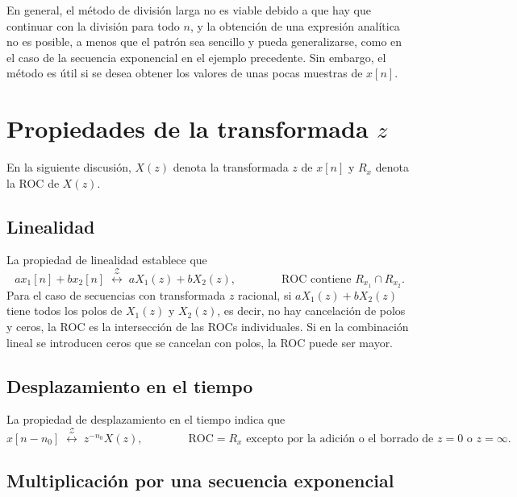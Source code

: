 \documentclass[a4paper]{report}
\begin{document}
En general, el método de división larga no es viable debido a que hay que continuar con la división para todo \(n\), y la obtención de una expresión analítica no es posible, a menos que el patrón sea sencillo y  pueda generalizarse, como en el caso de la secuencia exponencial en el ejemplo precedente. Sin embargo, el método es útil si se desea obtener los valores de unas pocas muestras de \(x[n]\).

\section{Propiedades de la transformada \texorpdfstring{\(z\)}{z}}\label{sec:z_transform_properties}
 
En la siguiente discusión, \(X(z)\) denota la transformada \(z\) de \(x[n]\) y \(R_x\) denota la ROC de \(X(z)\).

\subsection{Linealidad} 
 
La propiedad de linealidad establece que 
\[
 ax_1[n]+bx_2[n]\;\overset{\mathcal{Z}}{\longleftrightarrow}\;aX_1(z)+bX_2(z),
 \qquad\qquad\textrm{ROC contiene }R_{x_1}\cap R_{x_2}.
\]
Para el caso de secuencias con transformada \(z\) racional, si \(aX_1(z)+bX_2(z)\) tiene todos los polos de \(X_1(z)\) y \(X_2(z)\), es decir, no hay cancelación de polos y ceros, la ROC es la intersección de las ROCs individuales. Si en la combinación lineal se introducen ceros que se cancelan con polos, la ROC puede ser mayor.
 
\subsection{Desplazamiento en el tiempo} 
 
La propiedad de desplazamiento en el tiempo indica que 
\[
 x[n-n_0]\;\overset{\mathcal{Z}}{\longleftrightarrow}\;z^{-n_0}X(z),
 \qquad\qquad\textrm{ROC}=R_x
  \textrm{ excepto por la adición o el borrado de }z=0\textrm{ o }z=\infty. 
\]
 
\subsection{Multiplicación por una secuencia exponencial}  
\end{document}
